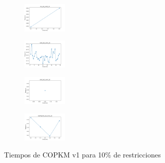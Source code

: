 \begin{figure}[H]
\begin{subfigure}
    \end{subfigure}
    \hfill
    \begin{subfigure}
        \centering
        \includegraphics[width=0.234\textwidth]{img/copkm/iris_set_const_10_3773969821_time.png}
    \end{subfigure}
    \hfill
    \begin{subfigure}
        \centering
        \includegraphics[width=0.234\textwidth]{img/copkm/ecoli_set_const_10_3773969821_time.png}
    \end{subfigure}
    \hfill
    \begin{subfigure}
        \centering
        \includegraphics[width=0.234\textwidth]{img/copkm/rand_set_const_10_3773969821_time.png}
    \end{subfigure}
    \hfill
    \begin{subfigure}
        \centering
        \includegraphics[width=0.234\textwidth]{img/copkm/newthyroid_set_const_10_3773969821_time.png}
    \end{subfigure}
    \caption{Tiempos de COPKM v1 para 10\% de restricciones}
\end{figure}

\vspace*{\fill}
\newpage
\vspace*{\fill}

